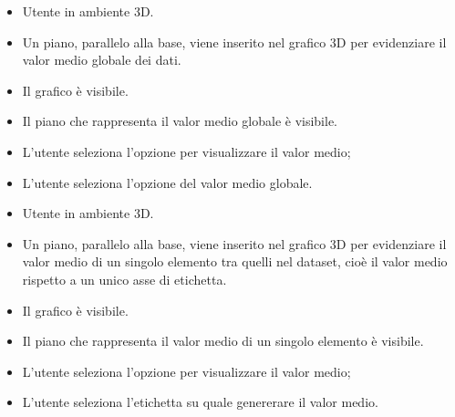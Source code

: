 \UCdsc
{ %
    \begin{itemize}
        \item Utente in ambiente 3D.
    \end{itemize}
}
{ %
    \begin{itemize}
        \item Un piano, parallelo alla base, viene inserito nel grafico 3D per evidenziare il valor medio globale dei dati.
    \end{itemize}
}
{ %
    \begin{itemize}
        \item Il grafico è visibile.
    \end{itemize}
}
{ %
    \begin{itemize}
        \item Il piano che rappresenta il valor medio globale è visibile.
    \end{itemize}
}
{ %
    \begin{itemize}
        \item L'utente seleziona l'opzione per visualizzare il valor medio;
        \item L'utente seleziona l'opzione del valor medio globale.
    \end{itemize}
}

\UCdsc
{ %
    \begin{itemize}
        \item Utente in ambiente 3D.
    \end{itemize}
}
{ %
    \begin{itemize}
        \item Un piano, parallelo alla base, viene inserito nel grafico 3D per evidenziare il valor medio di un singolo elemento tra quelli nel dataset, cioè il valor medio rispetto a un unico asse di etichetta.
    \end{itemize}
}
{ %
    \begin{itemize}
        \item Il grafico è visibile.
    \end{itemize}
}
{ %
    \begin{itemize}
        \item Il piano che rappresenta il valor medio di un singolo elemento è visibile.
    \end{itemize}
}
{ %
    \begin{itemize}
        \item L'utente seleziona l'opzione per visualizzare il valor medio;
        \item L'utente seleziona l'etichetta su quale genererare il valor medio.
    \end{itemize}
}




